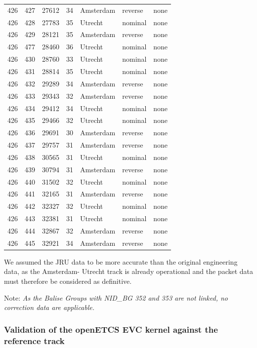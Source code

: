 \documentclass{template/openetcs_article}
\begin{document}
\begin{longtable}{|r |r |r |r |l |l |l |}
426 & 427 & 27612 & 34 & Amsterdam & reverse & none \\
426 & 428 & 27783 & 35 & Utrecht & nominal & none \\
426 & 429 & 28121 & 35 & Amsterdam & reverse & none \\
426 & 477 & 28460 & 36 & Utrecht & nominal & none \\
426 & 430 & 28760 & 33 & Utrecht & nominal & none \\
426 & 431 & 28814 & 35 & Utrecht & nominal & none \\
426 & 432 & 29289 & 34 & Amsterdam & reverse & none \\
426 & 433 & 29343 & 32 & Amsterdam & reverse & none \\
426 & 434 & 29412 & 34 & Utrecht & nominal & none \\
426 & 435 & 29466 & 32 & Utrecht & nominal & none \\
426 & 436 & 29691 & 30 & Amsterdam & reverse & none \\
426 & 437 & 29757 & 31 & Amsterdam & reverse & none \\
426 & 438 & 30565 & 31 & Utrecht & nominal & none \\
426 & 439 & 30794 & 31 & Amsterdam & reverse & none \\
426 & 440 & 31502 & 32 & Utrecht & nominal & none \\
426 & 441 & 32165 & 31 & Amsterdam & reverse & none \\
426 & 442 & 32327 & 32 & Utrecht & nominal & none \\
426 & 443 & 32381 & 31 & Utrecht & nominal & none \\
426 & 444 & 32867 & 32 & Amsterdam & reverse & none \\
426 & 445 & 32921 & 34 & Amsterdam & reverse & none \\
\end{longtable}

We assumed the JRU data to be more accurate than the original engineering data, as the Amsterdam- Utrecht track is already operational and the packet data must therefore be considered as definitive.

Note: \emph{As the Balise Groups with NID\_BG 352 and 353 are not linked, no correction data are applicable.}

\subsubsection{Validation of the openETCS EVC kernel against the reference track}
\end{document}
